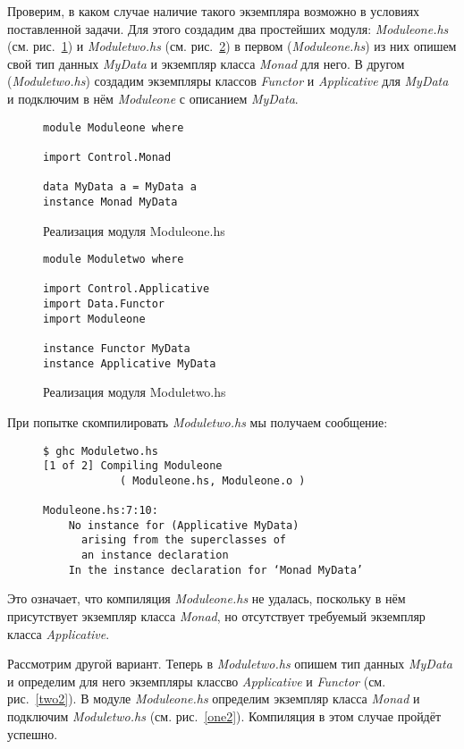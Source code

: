 Проверим, в каком случае наличие такого экземпляра возможно в условиях поставленной задачи. Для этого создадим два простейших модуля: \textit{Moduleone.hs} (см. рис.~\ref{one}) и \textit{Moduletwo.hs} (см. рис.~\ref{two}) в первом (\textit{Moduleone.hs}) из них опишем свой тип данных \textit{MyData} и экземпляр класса \textit{Monad} для него. В другом (\textit{Moduletwo.hs}) создадим экземпляры классов \textit{Functor} и \textit{Applicative} для \textit{MyData} и подключим в нём \textit{Moduleone} с описанием \textit{MyData}.
\begin{figure}[h]
\begin{lstlisting}
module Moduleone where

import Control.Monad

data MyData a = MyData a
instance Monad MyData
\end{lstlisting}
\caption{Реализация модуля Moduleone.hs}\label{one}
\end{figure}

\begin{figure}[h]
\begin{lstlisting}
module Moduletwo where

import Control.Applicative
import Data.Functor
import Moduleone

instance Functor MyData
instance Applicative MyData
\end{lstlisting}
\caption{Реализация модуля Moduletwo.hs}\label{two}
\end{figure}

При попытке скомпилировать \textit{Moduletwo.hs} мы получаем сообщение:
\begin{figure}[h]
\begin{verbatim}
$ ghc Moduletwo.hs
[1 of 2] Compiling Moduleone  
            ( Moduleone.hs, Moduleone.o )

Moduleone.hs:7:10:
    No instance for (Applicative MyData)
      arising from the superclasses of 
      an instance declaration
    In the instance declaration for ‘Monad MyData’
\end{verbatim}
\end{figure}

Это означает, что компиляция \textit{Moduleone.hs} не удалась, поскольку в нём присутствует экземпляр класса \textit{Monad}, но отсутствует требуемый экземпляр класса \textit{Applicative}.

Рассмотрим другой вариант. Теперь в \textit{Moduletwo.hs} опишем тип данных \textit{MyData} и определим для него экземпляры классво \textit{Applicative} и \textit{Functor} (см. рис.~\ref{two2}). В модуле \textit{Moduleone.hs} определим экземпляр класса \textit{Monad} и подключим \textit{Moduletwo.hs} (см. рис.~\ref{one2}). Компиляция в этом случае пройдёт успешно. 

